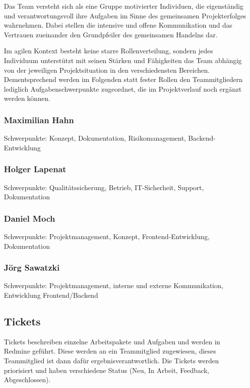 \documentclass[a4paper,11pt,listof=numbered,glossary=totoc,parskip=half,toc=bib]{scrreprt}
\begin{document}
{Das Team versteht sich als eine Gruppe motivierter Individuen, die eigenständig und verantwortungsvoll ihre Aufgaben im Sinne des gemeinsamen Projekterfolges wahrnehmen. Dabei stellen die intensive und offene Kommunikation und das Vertrauen zueinander den Grundpfeiler des gemeinsamen Handelns dar.

Im agilen Kontext besteht keine starre Rollenverteilung, sondern jedes Individuum unterstützt mit seinen Stärken und Fähigkeiten das Team abhängig von der jeweiligen Projektsituation in den verschiedensten Bereichen.
Dementsprechend werden im Folgenden statt fester Rollen den Teammitgliedern lediglich Aufgabenschwerpunkte zugeordnet, die im Projektverlauf noch ergänzt werden können.

\subsubsection{Maximilian Hahn}

Schwerpunkte: Konzept, Dokumentation, Risikomanagement, Backend-Entwicklung

\subsubsection{Holger Lapenat}

Schwerpunkte: Qualitätssicherung, Betrieb, IT-Sicherheit, Support, Dokumentation

\subsubsection{Daniel Moch}

Schwerpunkte: Projektmanagement, Konzept, Frontend-Entwicklung, Dokumentation

\subsubsection{Jörg Sawatzki}

Schwerpunkte: Projektmanagement, interne und externe Kommunikation, Entwicklung Frontend/Backend


\subsection{Tickets}

Tickets beschreiben einzelne Arbeitspakete und Aufgaben und werden in Redmine geführt. Diese werden an ein Teammitglied zugewiesen, dieses Teammitglied ist dann dafür ergebnisverantwortlich. Die Tickets werden priorisiert und haben verschiedene Status (Neu, In Arbeit, Feedback, Abgeschlossen).

}
\end{document}

